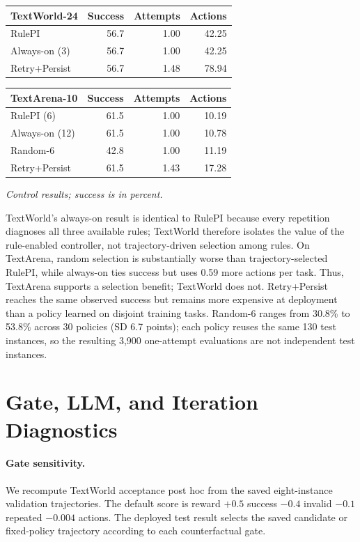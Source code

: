 \documentclass[11pt]{article}
\begin{document}
\begin{center}
\scriptsize
\setlength{\tabcolsep}{3pt}
\begin{tabular}{lrrr}
\toprule
TextWorld-24 & Success & Attempts & Actions \\
\midrule
RulePI & 56.7 & 1.00 & 42.25 \\
Always-on (3) & 56.7 & 1.00 & 42.25 \\
Retry+Persist & 56.7 & 1.48 & 78.94 \\
\bottomrule
\end{tabular}
\par\smallskip
\begin{tabular}{lrrr}
\toprule
TextArena-10 & Success & Attempts & Actions \\
\midrule
RulePI (6) & 61.5 & 1.00 & 10.19 \\
Always-on (12) & 61.5 & 1.00 & 10.78 \\
Random-6 & 42.8 & 1.00 & 11.19 \\
Retry+Persist & 61.5 & 1.43 & 17.28 \\
\bottomrule
\end{tabular}
\par\smallskip
\textit{Control results; success is in percent.}
\end{center}

TextWorld's always-on result is identical to RulePI because every repetition diagnoses all three available rules; TextWorld therefore isolates the value of the rule-enabled controller, not trajectory-driven selection among rules.
On TextArena, random selection is substantially worse than trajectory-selected RulePI, while always-on ties success but uses 0.59 more actions per task.
Thus, TextArena supports a selection benefit; TextWorld does not.
Retry+Persist reaches the same observed success but remains more expensive at deployment than a policy learned on disjoint training tasks.
Random-6 ranges from 30.8\% to 53.8\% across 30 policies (SD 6.7 points); each policy reuses the same 130 test instances, so the resulting 3,900 one-attempt evaluations are not independent test instances.

\section{Gate, LLM, and Iteration Diagnostics}

\paragraph{Gate sensitivity.}
We recompute TextWorld acceptance post hoc from the saved eight-instance validation trajectories.
The default score is reward $+0.5$ success $-0.4$ invalid $-0.1$ repeated $-0.004$ actions.
The deployed test result selects the saved candidate or fixed-policy trajectory according to each counterfactual gate.
\end{document}
